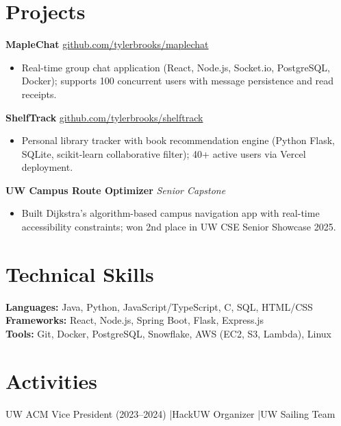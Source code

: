 \documentclass[11pt,a4paper]{article}
\begin{document}
\section{Projects}

\noindent\textbf{MapleChat} \quad \href{https://github.com/tylerbrooks/maplechat}{github.com/tylerbrooks/maplechat}
\begin{itemize}
  \item Real-time group chat application (React, Node.js, Socket.io, PostgreSQL, Docker); supports 100 concurrent users with message persistence and read receipts.
\end{itemize}

\noindent\textbf{ShelfTrack} \quad \href{https://github.com/tylerbrooks/shelftrack}{github.com/tylerbrooks/shelftrack}
\begin{itemize}
  \item Personal library tracker with book recommendation engine (Python Flask, SQLite, scikit-learn collaborative filter); 40+ active users via Vercel deployment.
\end{itemize}

\noindent\textbf{UW Campus Route Optimizer} \quad \textit{Senior Capstone}
\begin{itemize}
  \item Built Dijkstra's algorithm-based campus navigation app with real-time accessibility constraints; won 2nd place in UW CSE Senior Showcase 2025.
\end{itemize}

\section{Technical Skills}
\textbf{Languages:} Java, Python, JavaScript/TypeScript, C, SQL, HTML/CSS\\
\textbf{Frameworks:} React, Node.js, Spring Boot, Flask, Express.js\\
\textbf{Tools:} Git, Docker, PostgreSQL, Snowflake, AWS (EC2, S3, Lambda), Linux

\section{Activities}
UW ACM Vice President (2023--2024) \quad|\quad HackUW Organizer \quad|\quad UW Sailing Team
\end{document}
